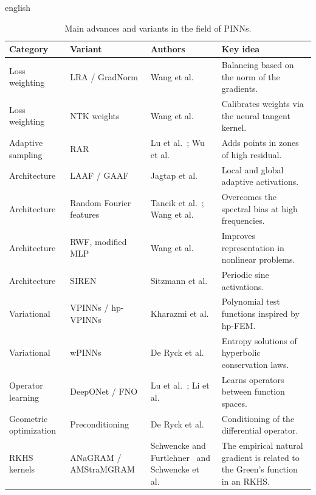 \documentclass[../0000.tex]{subfiles}
\begin{document}
\begin{hyphenrules}{english}
\begin{table}[htbp]
  \centering
  \caption{Main advances and variants in the field of PINNs.}
  \label{tab:pinn-variants}
  \small
  \begin{tabularx}{\linewidth}{@{}llXX@{}}
    \toprule
    Category & Variant & Authors & Key idea \\
    \midrule
    Loss weighting & LRA / GradNorm & Wang et al.~\cite{wang2021gradient} & Balancing based on the norm of the gradients. \\
    Loss weighting & NTK weights & Wang et al.~\cite{wang2022ntk} & Calibrates weights via the neural tangent kernel. \\
    Adaptive sampling & RAR & Lu et al.~\cite{lu2021deepxde}; Wu et al.~\cite{wu2023sampling} & Adds points in zones of high residual. \\
    Architecture & LAAF / GAAF & Jagtap et al.~\cite{jagtap2020a,jagtap2020b} & Local and global adaptive activations. \\
    Architecture & Random Fourier features & Tancik et al.~\cite{tancik2020}; Wang et al.~\cite{wang2021eigenvector} & Overcomes the spectral bias at high frequencies. \\
    Architecture & RWF, modified MLP & Wang et al.~\cite{wang2022rwf,wang2023expert} & Improves representation in nonlinear problems. \\
    Architecture & SIREN & Sitzmann et al.~\cite{sitzmann2020} & Periodic sine activations. \\
    Variational & VPINNs / hp-VPINNs & Kharazmi et al.~\cite{kharazmi2019,kharazmi2021} & Polynomial test functions inspired by hp-FEM. \\
    Variational & wPINNs & De Ryck et al.~\cite{deryck2024wpinn} & Entropy solutions of hyperbolic conservation laws. \\
    Operator learning & DeepONet / FNO & Lu et al.~\cite{lu2021deeponet}; Li et al.~\cite{li2021fno} & Learns operators between function spaces. \\
    Geometric optimization & Preconditioning & De Ryck et al.~\cite{deryck2024operator} & Conditioning of the differential operator. \\
    RKHS kernels & ANaGRAM / AMStraMGRAM & Schwencke and Furtlehner~\cite{schwencke2025anagram} and Schwencke et al.~\cite{schwencke2025amstramgram} & The empirical natural gradient is related to the Green's function in an RKHS. \\
    \bottomrule
  \end{tabularx}
\end{table}


\end{hyphenrules}
\end{document}

